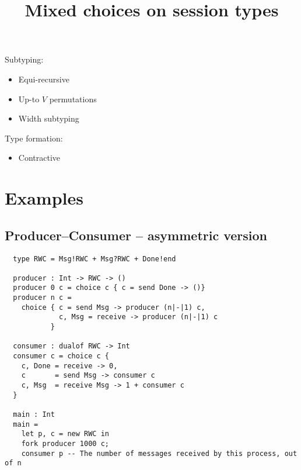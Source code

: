 \documentclass{article}
\title{Mixed choices on session types}
\begin{document}





\noindent
Subtyping:
\begin{itemize}
\item Equi-recursive
\item Up-to $V$ permutations
\item Width subtyping
\end{itemize}







\newpage
\noindent
Type formation:
\begin{itemize}
\item Contractive
\end{itemize}
\newpage
\section{Examples}
\lstset{language=freestMC}
\subsection{Producer--Consumer -- asymmetric version}
  \vspace{2cm}
\begin{lstlisting}
  type RWC = Msg!RWC + Msg?RWC + Done!end
  
  producer : Int -> RWC -> ()
  producer 0 c = choice c { c = send Done -> ()}
  producer n c =
    choice { c = send Msg -> producer (n|-|1) c,
             c, Msg = receive -> producer (n|-|1) c
           }

  consumer : dualof RWC -> Int
  consumer c = choice c {
    c, Done = receive -> 0,
    c       = send Msg -> consumer c
    c, Msg  = receive Msg -> 1 + consumer c
  }

  main : Int
  main =
    let p, c = new RWC in 
    fork producer 1000 c;
    consumer p -- The number of messages received by this process, out of n    
  \end{lstlisting}
  \newpage
\end{document}
